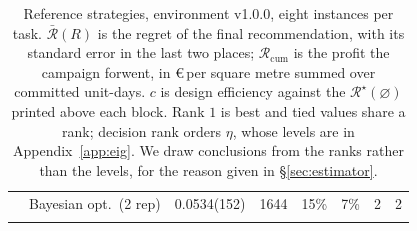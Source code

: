 \begin{table}[t]
\begin{tabular}{@{}llcccccc@{}}
& Bayesian opt.\ (2 rep) & 0.0534(152) & 1644 & 15\% & 7\% & 2 & 2 \\
\addlinespace
\bottomrule
\end{tabular}
\caption{Reference strategies, environment v1.0.0, eight instances per task. $\bar{\mathcal{R}}(R)$ is the regret of the final recommendation, with its standard error in the last two places; $\mathcal{R}_{\mathrm{cum}}$ is the profit the campaign forwent, in \euro\,per square metre summed over committed unit-days. $c$ is design efficiency against the $\mathcal{R}^\star(\varnothing)$ printed above each block. Rank $1$ is best and tied values share a rank; decision rank orders $\eta$, whose levels are in Appendix~\ref{app:eig}. We draw conclusions from the ranks rather than the levels, for the reason given in \S\ref{sec:estimator}.}
\label{tab:refs}
\end{table}
